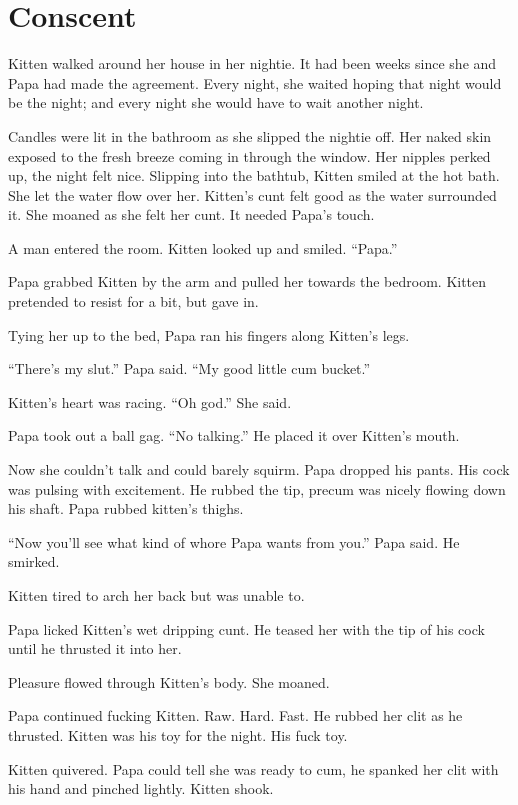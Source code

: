 \section{Conscent}

Kitten walked around her house in her nightie. It had been weeks since she and Papa had made the agreement. Every night, she waited hoping that night would be the night; and every night she would have to wait another night.

     Candles were lit in the bathroom as she slipped the nightie off. Her naked skin exposed to the fresh breeze coming in through the window. Her nipples perked up, the night felt nice. Slipping into the bathtub, Kitten smiled at the hot bath. She let the water flow over her. Kitten’s cunt felt good as the water surrounded it. She moaned as she felt her cunt. It needed Papa’s touch.

     A man entered the room. Kitten looked up and smiled. “Papa.”

     Papa grabbed Kitten by the arm and pulled her towards the bedroom. Kitten pretended to resist for a bit, but gave in.

     Tying her up to the bed, Papa ran his fingers along Kitten’s legs.

     “There’s my slut.” Papa said. “My good little cum bucket.”

     Kitten’s heart was racing. “Oh god.” She said.

     Papa took out a ball gag. “No talking.” He placed it over Kitten’s mouth.

     Now she couldn’t talk and could barely squirm. Papa dropped his pants. His cock was pulsing with excitement. He rubbed the tip, precum was nicely flowing down his shaft. Papa rubbed kitten’s thighs.

     “Now you’ll see what kind of whore Papa wants from you.” Papa said. He smirked.

     Kitten tired to arch her back but was unable to.

     Papa licked Kitten’s wet dripping cunt. He teased her with the tip of his cock until he thrusted it into her.

     Pleasure flowed through Kitten’s body. She moaned.

     Papa continued fucking Kitten. Raw. Hard. Fast. He rubbed her clit as he thrusted. Kitten was his toy for the night. His fuck toy.

     Kitten quivered. Papa could tell she was ready to cum, he spanked her clit with his hand and pinched lightly. Kitten shook.

